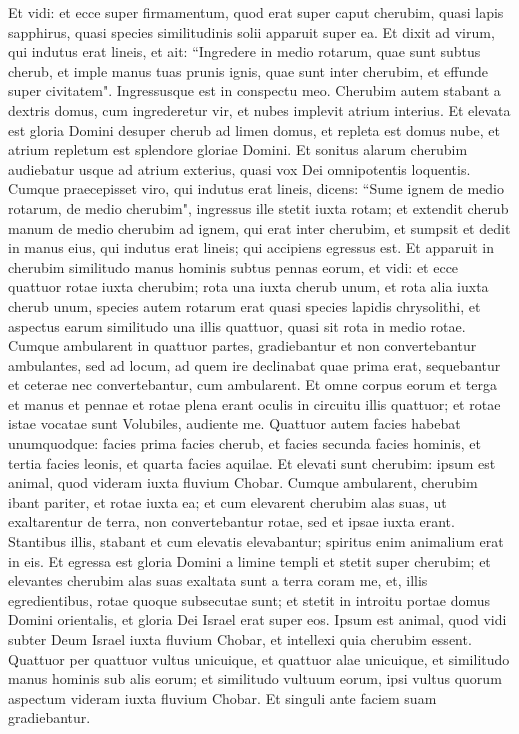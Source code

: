 \begin{biblechapter}  
\verse Et vidi: et ecce super firmamentum, quod erat super caput cherubim, quasi lapis sapphirus, quasi species similitudinis solii apparuit super ea.  
\verse Et dixit ad virum, qui indutus erat lineis, et ait: “Ingredere in medio rotarum, quae sunt subtus cherub, et imple manus tuas prunis ignis, quae sunt inter cherubim, et effunde super civitatem". Ingressusque est in conspectu meo. 
\verse Cherubim autem stabant a dextris domus, cum ingrederetur vir, et nubes implevit atrium interius. 
\verse Et elevata est gloria Domini desuper cherub ad limen domus, et repleta est domus nube, et atrium repletum est splendore gloriae Domini. 
\verse Et sonitus alarum cherubim audiebatur usque ad atrium exterius, quasi vox Dei omnipotentis loquentis. 
\verse Cumque praecepisset viro, qui indutus erat lineis, dicens: “Sume ignem de medio rotarum, de medio cherubim", ingressus ille stetit iuxta rotam; 
\verse et extendit cherub manum de medio cherubim ad ignem, qui erat inter cherubim, et sumpsit et dedit in manus eius, qui indutus erat lineis; qui accipiens egressus est. 
\verse Et apparuit in cherubim similitudo manus hominis subtus pennas eorum,  
\verse et vidi: et ecce quattuor rotae iuxta cherubim; rota una iuxta cherub unum, et rota alia iuxta cherub unum, species autem rotarum erat quasi species lapidis chrysolithi, 
\verse et aspectus earum similitudo una illis quattuor, quasi sit rota in medio rotae. 
\verse Cumque ambularent in quattuor partes, gradiebantur et non convertebantur ambulantes, sed ad locum, ad quem ire declinabat quae prima erat, sequebantur et ceterae nec convertebantur, cum ambularent. 
\verse Et omne corpus eorum et terga et manus et pennae et rotae plena erant oculis in circuitu illis quattuor; 
\verse et rotae istae vocatae sunt Volubiles, audiente me. 
\verse Quattuor autem facies habebat unumquodque: facies prima facies cherub, et facies secunda facies hominis, et tertia facies leonis, et quarta facies aquilae. 
\verse Et elevati sunt cherubim: ipsum est animal, quod videram iuxta fluvium Chobar. 
\verse Cumque ambularent, cherubim ibant pariter, et rotae iuxta ea; et cum elevarent cherubim alas suas, ut exaltarentur de terra, non convertebantur rotae, sed et ipsae iuxta erant. 
\verse Stantibus illis, stabant et cum elevatis elevabantur; spiritus enim animalium erat in eis. 
\verse Et egressa est gloria Domini a limine templi et stetit super cherubim; 
\verse et elevantes cherubim alas suas exaltata sunt a terra coram me, et, illis egredientibus, rotae quoque subsecutae sunt; et stetit in introitu portae domus Domini orientalis, et gloria Dei Israel erat super eos. 
\verse Ipsum est animal, quod vidi subter Deum Israel iuxta fluvium Chobar, et intellexi quia cherubim essent. 
\verse Quattuor per quattuor vultus unicuique, et quattuor alae unicuique, et similitudo manus hominis sub alis eorum; 
\verse et similitudo vultuum eorum, ipsi vultus quorum aspectum videram iuxta fluvium Chobar. Et singuli ante faciem suam gradiebantur. 
\end{biblechapter}

